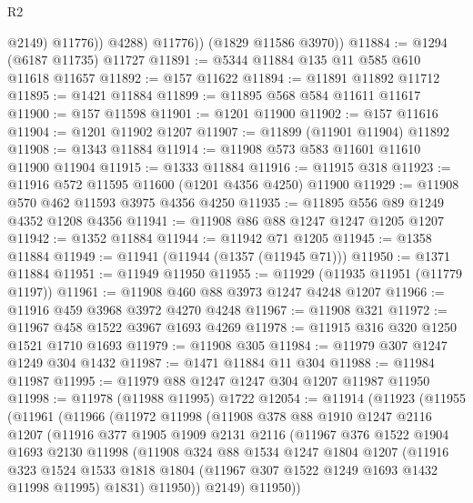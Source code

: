 \begin{lexlean}{R2}
\begin{coremodule}
                  @2149)
                @11776))
            @4288)
          @11776))
      (@1829 @11586 @3970))
@11884 := @1294 (@6187 @11735) @11727
@11891 := @5344 @11884 @135 @11 @585 @610 @11618 @11657
@11892 := @157 @11622
@11894 := @11891 @11892 @11712
@11895 := @1421 @11884
@11899 := @11895 @568 @584 @11611 @11617
@11900 := @157 @11598
@11901 := @1201 @11900
@11902 := @157 @11616
@11904 := @1201 @11902 @1207
@11907 := @11899 (@11901 @11904) @11892
@11908 := @1343 @11884
@11914 := @11908 @573 @583 @11601 @11610 @11900 @11904
@11915 := @1333 @11884
@11916 := @11915 @318
@11923 := @11916 @572 @11595 @11600 (@1201 @4356 @4250) @11900
@11929 := @11908 @570 @462 @11593 @3975 @4356 @4250
@11935 := @11895 @556 @89 @1249 @4352 @1208 @4356
@11941 := @11908 @86 @88 @1247 @1247 @1205 @1207
@11942 := @1352 @11884
@11944 := @11942 @71 @1205
@11945 := @1358 @11884
@11949 := @11941 (@11944 (@1357 (@11945 @71)))
@11950 := @1371 @11884
@11951 := @11949 @11950
@11955 := @11929 (@11935 @11951 (@11779 @1197))
@11961 := @11908 @460 @88 @3973 @1247 @4248 @1207
@11966 := @11916 @459 @3968 @3972 @4270 @4248
@11967 := @11908 @321
@11972 := @11967 @458 @1522 @3967 @1693 @4269
@11978 := @11915 @316 @320 @1250 @1521 @1710 @1693
@11979 := @11908 @305
@11984 := @11979 @307 @1247 @1249 @304 @1432
@11987 := @1471 @11884 @11 @304
@11988 := @11984 @11987
@11995 := @11979 @88 @1247 @1247 @304 @1207 @11987 @11950
@11998 := @11978 (@11988 @11995) @1722
@12054 := @11914
    (@11923
      (@11955
        (@11961
          (@11966
            (@11972
              @11998
              (@11908
                @378
                @88
                @1910
                @1247
                @2116
                @1207
                (@11916
                  @377
                  @1905
                  @1909
                  @2131
                  @2116
                  (@11967
                    @376
                    @1522
                    @1904
                    @1693
                    @2130
                    @11998
                    (@11908
                      @324
                      @88
                      @1534
                      @1247
                      @1804
                      @1207
                      (@11916
                        @323
                        @1524
                        @1533
                        @1818
                        @1804
                        (@11967 @307 @1522 @1249 @1693 @1432 @11998 @11995)
                        @1831)
                      @11950))
                  @2149)
                @11950))

\end{coremodule}
\end{lexlean}
